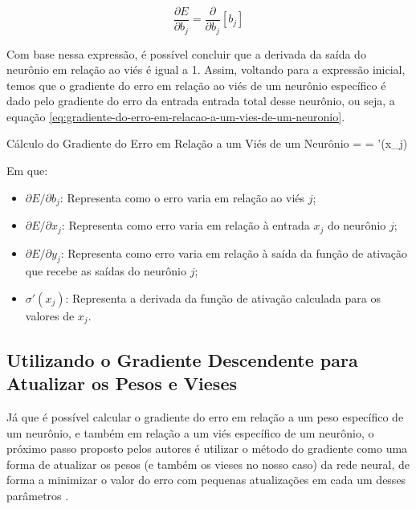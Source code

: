 \[
        \frac{\partial E}{\partial b_j} = \frac{\partial}{\partial b_j} \left[ b_j \right]
\]

Com base nessa expressão, é possível concluir que a derivada da saída do neurônio em relação ao viés é igual a 1. Assim, voltando para a expressão inicial, temos que o gradiente do erro em relação ao viés de um neurônio específico é dado pelo gradiente do erro da entrada entrada total desse neurônio, ou seja, a equação \ref{eq:gradiente-do-erro-em-relacao-a-um-vies-de-um-neuronio}.

\begin{equacaodestaque}{Cálculo do Gradiente do Erro em Relação a um Viés de um Neurônio}
     =  \quad {} \quad {} =  \cdot \sigma'(x_j)
    \label{eq:gradiente-do-erro-em-relacao-a-um-vies-de-um-neuronio}
\end{equacaodestaque}

Em que:

\begin{itemize}
    \item $\partial E / \partial b_j$: Representa como o erro varia em relação ao viés $j$;
    \item $\partial E / \partial x_j$: Representa como erro varia em relação à entrada $x_j$ do neurônio $j$;
    \item $\partial E / \partial y_j$: Representa como erro varia em relação à saída da função de ativação que recebe as saídas do neurônio $j$;
    \item $\sigma'(x_j)$: Representa a derivada da função de ativação calculada para os valores de $x_j$.
\end{itemize}

\subsection{Utilizando o Gradiente Descendente para Atualizar os Pesos e Vieses}

Já que é possível calcular o gradiente do erro em relação a um peso específico de um neurônio, e também em relação a um viés específico de um neurônio, o próximo passo proposto pelos autores é utilizar o método do gradiente como uma forma de atualizar os pesos (e também os vieses no nosso caso) da rede neural, de forma a minimizar o valor do erro com pequenas atualizações em cada um desses parâmetros \parencite{BackpropagationArticle}.

